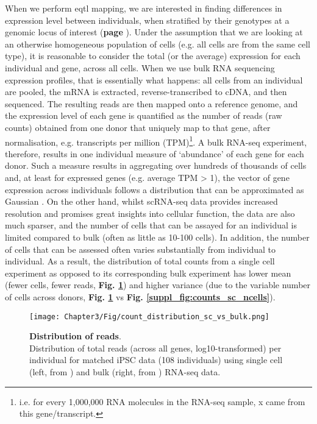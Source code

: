 When we perform \gls{eqtl} mapping, we are interested in finding differences in expression level between individuals, when stratified by their genotypes at a genomic locus of interest (\textbf{page \pageref{fig:eqtl}}). 
Under the assumption that we are looking at an otherwise homogeneous population of cells (e.g. all cells are from the same cell type), it is reasonable to consider the total (or the average) expression for each individual and gene, across all cells.
When we use bulk RNA sequencing expression profiles, that is essentially what happens: all cells from an individual are pooled, the mRNA is extracted, reverse-transcribed to cDNA, and then sequenced. 
The resulting reads are then mapped onto a reference genome, and the expression level of each gene is quantified as the number of reads (raw counts) obtained from one donor that uniquely map to that gene, after normalisation, e.g. transcripts per million (TPM)\footnote{i.e. for every 1,000,000 RNA molecules in the RNA-seq sample, x came from this gene/transcript.}. 
A bulk RNA-seq experiment, therefore, results in one individual measure of `abundance' of each gene for each donor. 
Such a measure results in aggregating over hundreds of thousands of cells and, at least for expressed genes (e.g. average TPM > 1), the vector of gene expression across individuals follows a distribution that can be approximated as Gaussian \cite{piras2015reduction}.
On the other hand, whilst scRNA-seq data provides increased resolution and promises great insights into cellular function, the data are also much sparser, and the number of cells that can be assayed for an individual is limited compared to bulk (often as little as 10-100 cells). 
In addition, the number of cells that can be assessed often varies substantially from individual to individual.
As a result, the distribution of total counts from a single cell experiment as opposed to its corresponding bulk experiment has lower mean (fewer cells, fewer reads, \textbf{Fig. \ref{fig:sc_bulk_counts}}) and higher variance (due to the variable number of cells across donors, \textbf{Fig. \ref{fig:sc_bulk_counts}} vs \textbf{Fig. \ref{suppl_fig:counts_sc_ncells}}).

\begin{figure}[h]
\centering
\texttt{[image: Chapter3/Fig/count\_distribution\_sc\_vs\_bulk.png]}
\caption[Distribution of reads]{\textbf{Distribution of reads}.\\
Distribution of total reads (across all genes, log10-transformed) per individual for matched iPSC data (108 individuals) using single cell (left, from \cite{cuomo2020single}) and bulk (right, from \cite{mirauta2018population}) RNA-seq data.}
\label{fig:sc_bulk_counts}
\end{figure}

